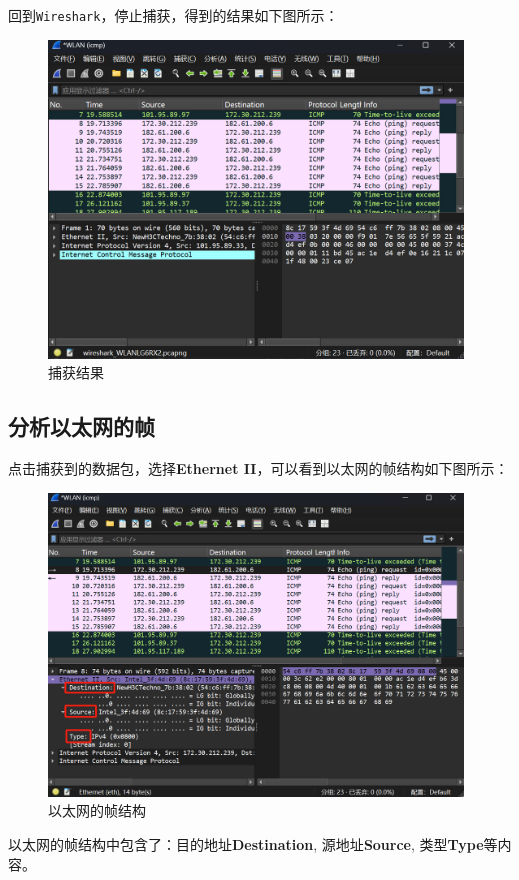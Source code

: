 \documentclass{article}
\begin{document}
	回到\texttt{Wireshark}，停止捕获，得到的结果如下图所示：
	
	\begin{figure}[H]
		\centering
		\includegraphics[width=11cm]{images/4.捕获结果.png}
		\caption{捕获结果}
	\end{figure}
	
	\subsection{分析以太网的帧}
	
	点击捕获到的数据包，选择\textbf{Ethernet II}，可以看到以太网的帧结构如下图所示：
	
	\begin{figure}[H]
		\centering
		\includegraphics[width=11cm]{images/5.以太网的帧结构.png}
		\caption{以太网的帧结构}
	\end{figure}
	
	以太网的帧结构中包含了：目的地址\textbf{Destination}, 源地址\textbf{Source}, 类型\textbf{Type}等内容。
	
\end{document}
